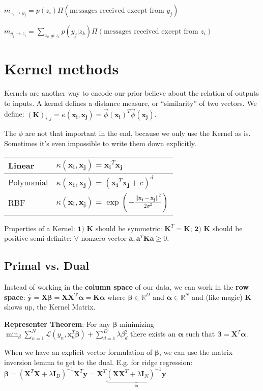\documentclass[10pt,a4paper,landscape]{article}
\renewcommand{\bf}[1]{\ensuremath{\mathbf{#1}}}
\newcommand{\balpha}{\boldsymbol\alpha}
\newcommand{\bbeta}{\boldsymbol\beta}
\begin{document}
\begin{multicols*}{4}
$m_{z_i \rightarrow y_j} = p(z_i) \Pi(\text{messages received except from } y_j)$

$m_{y_j \rightarrow z_i} = \sum_{z_k \neq z_i} p(y_j | z_k) \Pi(\text{messages received except from } z_i)$

\section{Kernel methods}
Kernels are another way to encode our prior believe about the relation of outputs to inputs. A kernel defines a distance measure, or ``similarity'' of two vectors. We define:
$(\bf{K})_{i,j} = \kappa(\bf{x_i}, \bf{x_j}) = \vec \phi(\bf{x_i})^T \vec \phi(\bf{x_j})$.

The $\phi$ are not that important in the end, because we only use the Kernel as is. Sometimes it's even impossible to write them down explicitly.

\begin{tabular}{ l | l }
  \hline
  Linear     & $\kappa(\bf{x_i}, \bf{x_j}) = \bf{x_i}^T \bf{x_j}$ \\
  \hline
  Polynomial & $\kappa(\bf{x_i}, \bf{x_j}) = (\bf{x_i}^T \bf{x_j} + c)^d$ \\
  \hline
  RBF        & $\kappa(\bf{x_i}, \bf{x_j}) = \exp\left(-\frac{||\bf{x_i} - \bf{x_j}||^2}{2\sigma^2}\right)$ \\
  \hline
\end{tabular}

Properties of a Kernel: $\bf{1)}$ $\bf{K}$ should be symmetric: $\bf{K}^T = \bf{K}$; $\bf{2)}$ $\bf{K}$ should be positive semi-definite: $\forall$ nonzero vector $\bf{a}, \bf{a}^T \bf{K} \bf{a} \geq 0$.

\subsection{Primal vs. Dual}
Instead of working in the \textbf{column space} of our data, we can work in the \textbf{row space}:
$\bf{\hat{y} = X \bbeta = X X^T \balpha = K \balpha}$
where $\bbeta \in \mathbb{R}^D$ and $\balpha \in \mathbb{R}^N$
and (like magic) $\bf{K}$ shows up, the Kernel Matrix.

\textbf{Representer Theorem}: For any $\bbeta$ minimizing
$\min_\beta \sum_{n=1}^N \mathcal{L}(y_n, \bf{x}_n^T \bbeta) + \sum_{d=1}^D \lambda \beta_d^2$
there exists an $\balpha$ such that $\bbeta = \bf{X}^T \balpha$.

When we have an explicit vector formulation of $\bbeta$, we can use the matrix inversion lemma to get to the dual. E.g. for ridge regression:
$\bbeta = (\bf{X}^T \bf{X}  + \lambda \bf{I}_D)^{-1} \bf{X}^T \bf{y}= \bf{X}^T \underbrace{(\bf{X X}^T + \lambda \bf{I}_N)^{-1} \bf{y}}_{\balpha}$


\end{multicols*}
\end{document}
